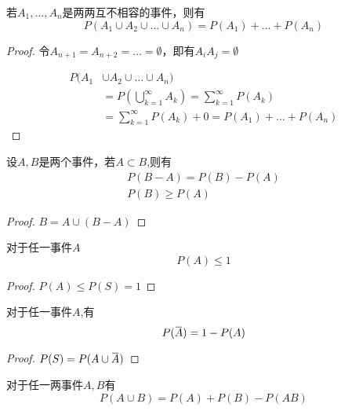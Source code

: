 \documentclass[11pt]{article}
\begin{document}
\begin{proposition}[有限可加性]
若\(A_1,\dots,A_n\)是两两互不相容的事件，则有
\begin{equation*}
P(A_1\cup A_2\cup\dots\cup A_n)=P(A_1)+\dots+P(A_n)
\end{equation*}
\end{proposition}

\begin{proof}
令\(A_{n+1}=A_{n+2}=\dots=\emptyset\)，即有\(A_iA_j=\emptyset\)

\begin{align*}
P(A_1&\cup A_2\cup\dots\cup A_n)\\
&=P(\bigcup_{k=1}^\infty A_k)=\sum_{k=1}^\infty P(A_k)\\
&=\sum_{k=1}^\infty P(A_k)+0=P(A_1)+\dots+P(A_n)
\end{align*}
\end{proof}

\begin{proposition}[]
设\(A,B\)是两个事件，若\(A\subset B\),则有
\begin{gather*}
P(B-A)=P(B)-P(A)\\
P(B)\ge P(A)
\end{gather*}
\end{proposition}

\begin{proof}
\(B=A\cup (B-A)\)
\end{proof}

\begin{proposition}[]
对于任一事件\(A\)
\begin{equation*}
P(A)\le 1
\end{equation*}
\end{proposition}

\begin{proof}
\(P(A)\le P(S)=1\)
\end{proof}

\begin{proposition}[逆事件的概率]
对于任一事件\(A\),有
\begin{equation*}
P(\bbar{A})=1-P(A)
\end{equation*}
\end{proposition}

\begin{proof}
\(P(S)=P(A\cup\bbar{A})\)
\end{proof}

\begin{proposition}[加法公式]
对于任一两事件\(A,B\)有
\begin{equation*}
P(A\cup B)=P(A)+P(B)-P(AB)
\end{equation*}
\end{proposition}
\end{document}
